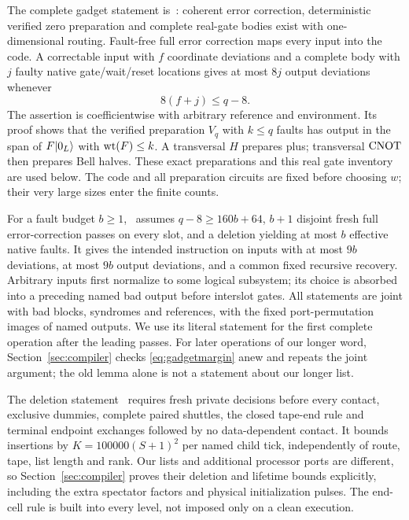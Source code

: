 The complete gadget statement is~\cite[Lemma~5.2]{DMMemory2026}: coherent error correction, deterministic verified zero preparation and complete real-gate bodies exist with one-dimensional routing. Fault-free full error correction maps every input into the code. A correctable input with $f$ coordinate deviations and a complete body with $j$ faulty native gate/wait/reset locations gives at most $8j$ output deviations whenever
\begin{equation}\label{eq:gadgetmargin}
 8(f+j)\le q-8.
\end{equation}
The assertion is coefficientwise with arbitrary reference and environment. Its proof shows that the verified preparation $V_q$ with $k\le q$ faults has output in the span of $F\lvert 0_L\rangle$ with $\operatorname{wt}(F)\le k$. A transversal $H$ prepares plus; transversal $\operatorname{CNOT}$ then prepares Bell halves. These exact preparations and this real gate inventory are used below. The code and all preparation circuits are fixed before choosing $w$; their very large sizes enter the finite counts.

For a fault budget $b\ge1$,~\cite[Lemma~13.1]{DMMemory2026} assumes $q-8\ge160b+64$, $b+1$ disjoint fresh full error-correction passes on every slot, and a deletion yielding at most $b$ effective native faults. It gives the intended instruction on inputs with at most $9b$ deviations, at most $9b$ output deviations, and a common fixed recursive recovery. Arbitrary inputs first normalize to some logical subsystem; its choice is absorbed into a preceding named bad output before interslot gates. All statements are joint with bad blocks, syndromes and references, with the fixed port-permutation images of named outputs. We use its literal statement for the first complete operation after the leading passes. For later operations of our longer word, Section~\ref{sec:compiler} checks \eqref{eq:gadgetmargin} anew and repeats the joint argument; the old lemma alone is not a statement about our longer list.

The deletion statement~\cite[Lemma~13.2]{DMMemory2026} requires fresh private decisions before every contact, exclusive dummies, complete paired shuttles, the closed tape-end rule and terminal endpoint exchanges followed by no data-dependent contact. It bounds insertions by $K=100000(S+1)^2$ per named child tick, independently of route, tape, list length and rank. Our lists and additional processor ports are different, so Section~\ref{sec:compiler} proves their deletion and lifetime bounds explicitly, including the extra spectator factors and physical initialization pulses. The end-cell rule is built into every level, not imposed only on a clean execution.

